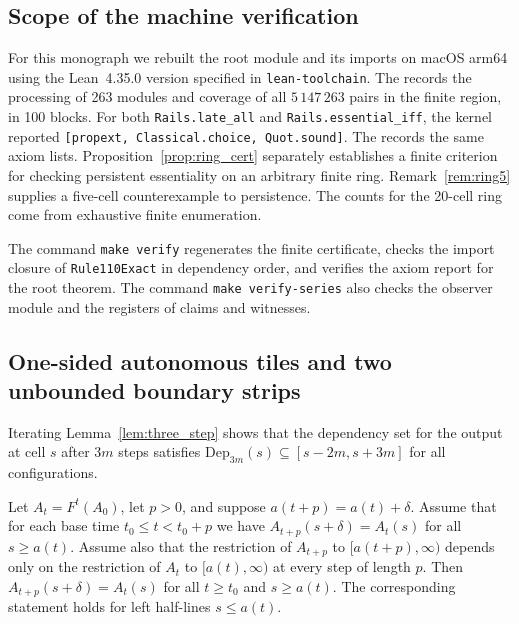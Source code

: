 \subsection{Scope of the machine verification}
For this monograph we rebuilt the root module and its imports on macOS arm64 using the Lean~4.35.0 version specified in \texttt{lean-toolchain}. The  records the processing of 263 modules and coverage of all $5\,147\,263$ pairs in the finite region, in 100 blocks. For both \texttt{Rails.late\_all} and \texttt{Rails.essential\_iff}, the kernel reported \texttt{[propext, Classical.choice, Quot.sound]}. The  records the same axiom lists. Proposition~\ref{prop:ring_cert} separately establishes a finite criterion for checking persistent essentiality on an arbitrary finite ring. Remark~\ref{rem:ring5} supplies a five-cell counterexample to persistence. The counts for the 20-cell ring come from exhaustive finite enumeration.

The command \texttt{make verify} regenerates the finite certificate, checks the import closure of \texttt{Rule110Exact} in dependency order, and verifies the axiom report for the root theorem. The command \texttt{make verify-series} also checks the observer module and the registers of claims and witnesses.

\subsection{One-sided autonomous tiles and two unbounded boundary strips}\label{app:half-ray-tiles}

Iterating Lemma~\ref{lem:three_step} shows that the dependency set for the output at cell $s$ after $3m$ steps satisfies $\mathrm{Dep}_{3m}(s) \subseteq [s - 2m, s + 3m]$ for all configurations.

\begin{lemma}\label{lem:one_sided}
Let $A_t = F^t(A_0)$, let $p > 0$, and suppose $a(t + p) = a(t) + \delta$. Assume that for each base time $t_0 \le t < t_0 + p$ we have $A_{t+p}(s + \delta) = A_t(s)$ for all $s \ge a(t)$. Assume also that the restriction of $A_{t+p}$ to $[a(t+p), \infty)$ depends only on the restriction of $A_t$ to $[a(t), \infty)$ at every step of length $p$. Then $A_{t+p}(s + \delta) = A_t(s)$ for all $t \ge t_0$ and $s \ge a(t)$. The corresponding statement holds for left half-lines $s \le a(t)$.
\end{lemma}

